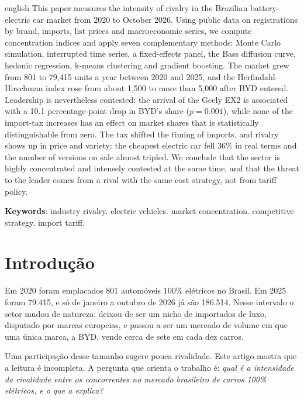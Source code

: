 \documentclass[article,11pt,oneside,a4paper,english,brazil,sumario=tradicional]{abntex2}
\begin{document}
\renewcommand{\resumoname}{Abstract}
\begin{resumoumacoluna}
\begin{otherlanguage*}{english}
This paper measures the intensity of rivalry in the Brazilian battery-electric car market from 2020 to October 2026. Using public data on registrations by brand, imports, list prices and macroeconomic series, we compute concentration indices and apply seven complementary methods: Monte Carlo simulation, interrupted time series, a fixed-effects panel, the Bass diffusion curve, hedonic regression, k-means clustering and gradient boosting. The market grew from 801 to 79,415 units a year between 2020 and 2025, and the Herfindahl-Hirschman index rose from about 1,500 to more than 5,000 after BYD entered. Leadership is nevertheless contested: the arrival of the Geely EX2 is associated with a 10.1 percentage-point drop in BYD's share ($p = 0.001$), while none of the import-tax increases has an effect on market shares that is statistically distinguishable from zero. The tax shifted the timing of imports, and rivalry shows up in price and variety: the cheapest electric car fell 36\% in real terms and the number of versions on sale almost tripled. We conclude that the sector is highly concentrated and intensely contested at the same time, and that the threat to the leader comes from a rival with the same cost strategy, not from tariff policy.

\vspace{\onelineskip}
\noindent
\textbf{Keywords}: industry rivalry. electric vehicles. market concentration. competitive strategy. import tariff.
\end{otherlanguage*}
\end{resumoumacoluna}

\textual

\section{Introdução}

Em 2020 foram emplacados 801 automóveis 100\% elétricos no Brasil. Em 2025 foram 79.415, e só de janeiro a outubro de 2026 já são 186.514. Nesse intervalo o setor mudou de natureza: deixou de ser um nicho de importados de luxo, disputado por marcas europeias, e passou a ser um mercado de volume em que uma única marca, a BYD, vende cerca de sete em cada dez carros.

Uma participação desse tamanho sugere pouca rivalidade. Este artigo mostra que a leitura é incompleta. A pergunta que orienta o trabalho é: \textit{qual é a intensidade da rivalidade entre os concorrentes no mercado brasileiro de carros 100\% elétricos, e o que a explica?}
\end{document}
